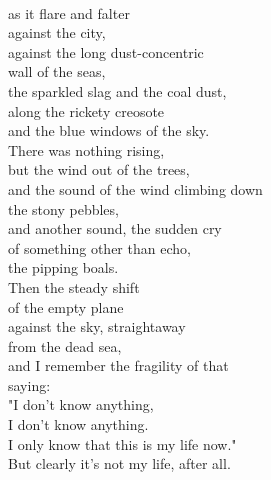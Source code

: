 \documentclass[smalldemyvopaper,11pt,twoside,onecolumn,openright,extrafontsizes]{memoir}
\begin{document}
\\as it flare and falter
\\against the city,
\\against the long dust-concentric
\\wall of the seas,
\\the sparkled slag and the coal dust,
\\along the rickety creosote
\\and the blue windows of the sky.
\\There was nothing rising,
\\but the wind out of the trees,
\\and the sound of the wind climbing down
\\the stony pebbles,
\\and another sound, the sudden cry
\\of something other than echo,
\\the pipping boals.
\\Then the steady shift
\\of the empty plane
\\against the sky, straightaway
\\from the dead sea,
\\and I remember the fragility of that
\\saying:
\\"I don't know anything,
\\I don't know anything.
\\I only know that this is my life now."
\\But clearly it's not my life, after all.
\end{document}
